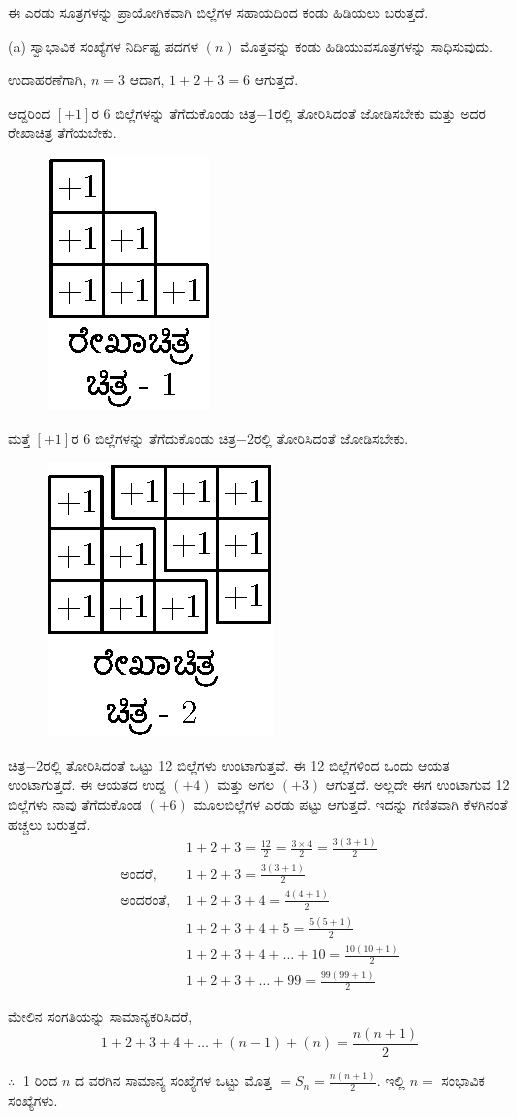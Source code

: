 \eject

ಈ ಎರಡು ಸೂತ್ರಗಳನ್ನು ಪ್ರಾಯೋಗಿಕವಾಗಿ ಬಿಲ್ಲೆಗಳ ಸಹಾಯದಿಂದ ಕಂಡು ಹಿಡಿ\break ಯಲು ಬರುತ್ತದೆ. 

(a) ಸ್ವಾಭಾವಿಕ ಸಂಖ್ಯೆಗಳ ನಿರ್ದಿಷ್ಟ ಪದಗಳ $(n)$ ಮೊತ್ತವನ್ನು ಕಂಡು ಹಿಡಿಯುವ\break ಸೂತ್ರಗಳನ್ನು ಸಾಧಿಸುವುದು. 

ಉದಾಹರಣೆಗಾಗಿ, $n = 3$ ಆದಾಗ, $1 + 2 + 3 = 6$ ಆಗುತ್ತದೆ. 

ಆದ್ದರಿಂದ $[+1]$ರ 6 ಬಿಲ್ಲೆಗಳನ್ನು ತೆಗೆದುಕೊಂಡು ಚಿತ್ರ$-$1ರಲ್ಲಿ ತೋರಿಸಿದಂತೆ ಜೋಡಿಸ\-ಬೇಕು ಮತ್ತು ಅದರ ರೇಖಾಚಿತ್ರ ತೆಗೆಯಬೇಕು.
\begin{figure}[H]
\centering
\includegraphics{src/figure/chap3/fig3-57a.eps}
\end{figure}

ಮತ್ತೆ $[+1]$ರ 6 ಬಿಲ್ಲೆಗಳನ್ನು ತೆಗೆದುಕೊಂಡು ಚಿತ್ರ$-$2ರಲ್ಲಿ ತೋರಿಸಿದಂತೆ ಜೋಡಿಸ\-ಬೇಕು.
\begin{figure}[H]
\centering
\includegraphics{src/figure/chap3/fig3-57b.eps}
\end{figure}

ಚಿತ್ರ$-$2ರಲ್ಲಿ ತೋರಿಸಿದಂತೆ ಒಟ್ಟು 12 ಬಿಲ್ಲೆಗಳು ಉಂಟಾಗುತ್ತವೆ. ಈ 12 ಬಿಲ್ಲೆ\break ಗಳಿಂದ \hbox{ಒಂದು} ಆಯತ ಉಂಟಾಗುತ್ತದೆ. ಈ ಆಯತದ ಉದ್ದ $(+4)$ ಮತ್ತು ಅಗಲ $(+3)$ ಆಗುತ್ತದೆ. ಅಲ್ಲದೇ ಈಗ ಉಂಟಾಗುವ 12 ಬಿಲ್ಲೆಗಳು ನಾವು ತೆಗೆದುಕೊಂಡ $(+6)$ ಮೂಲಬಿಲ್ಲೆಗಳ ಎರಡು ಪಟ್ಟು ಆಗುತ್ತದೆ. ಇದನ್ನು ಗಣಿತವಾಗಿ ಕೆಳಗಿನಂತೆ ಹಚ್ಚಲು ಬರುತ್ತದೆ. 
\begin{align*}
& 1 + 2 + 3 = \frac{12}{2} = \frac{3 \times 4}{2} = \frac{3(3+1)}{2}\\
\text{ಅಂದರೆ, } & 1 + 2 + 3 = \frac{3(3+1)}{2}\\
\text{ಅಂದರಂತೆ, } & 1 + 2 + 3 + 4 = \frac{4(4+1)}{2}\\
& 1 + 2 + 3 + 4 + 5 = \frac{5(5+1)}{2}\\
& 1 + 2 + 3 + 4 + \hdots + 10 = \frac{10(10+1)}{2}\\
& 1 + 2 + 3 + \hdots + 99 = \frac{99(99+1)}{2}
\end{align*}

ಮೇಲಿನ ಸಂಗತಿಯನ್ನು ಸಾಮಾನ್ಯಕರಿಸಿದರೆ,
$$
1 + 2 + 3 + 4 + \hdots + (n-1) + (n) = \frac{n(n+1)}{2}
$$

$\therefore~$ 1 ರಿಂದ $n$ ದ ವರಗಿನ ಸಾಮಾನ್ಯ ಸಂಖ್ಯೆಗಳ ಒಟ್ಟು ಮೊತ್ತ $= S_{n} = \frac{n(n+1)}{2}$. ಇಲ್ಲಿ $n =$ ಸಂಭಾವಿಕ ಸಂಖ್ಯೆಗಳು. 
